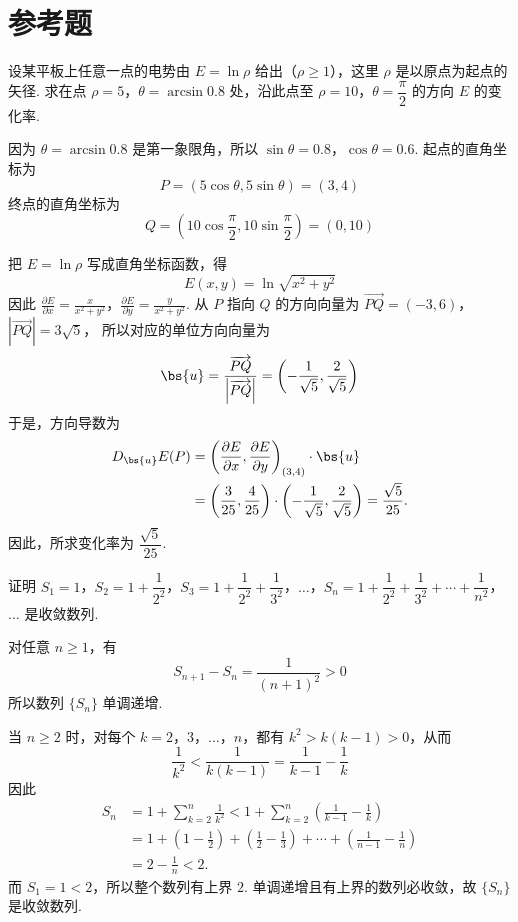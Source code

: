 \section{参考题}

\begin{problem}
设某平板上任意一点的电势由 \(E=\ln\rho\) 给出（\(\rho\geqslant1\)），这里 \(\rho\) 是以原点为起点的矢径. 求在点 \(\rho=5\)，\(\theta=\arcsin0.8\) 处，沿此点至 \(\rho=10\)，\(\theta=\dfrac{\pi}{2}\) 的方向 \(E\) 的变化率.
\end{problem}

\begin{solution}
因为 \(\theta=\arcsin0.8\) 是第一象限角，所以 \(\sin\theta=0.8\)，\(\cos\theta=0.6\). 起点的直角坐标为
\[
P=(5\cos\theta,5\sin\theta)=(3,4)
\]
终点的直角坐标为
\[
Q=\left(10\cos\frac\pi2,10\sin\frac\pi2\right)=(0,10)
\]


把 \(E=\ln\rho\) 写成直角坐标函数，得
\[
E(x,y)=\ln\sqrt{x^2+y^2}
\]
因此
\(\frac{\partial E}{\partial x}=\frac{x}{x^2+y^2}\)，\(\frac{\partial E}{\partial y}=\frac{y}{x^2+y^2}\).
从 \(P\) 指向 \(Q\) 的方向向量为
\(\overrightarrow{PQ}=(-3,6)\)，\(\left|\overrightarrow{PQ}\right|=3\sqrt5\)，
所以对应的单位方向向量为
\[
\bs{u}=\frac{\overrightarrow{PQ}}{\left|\overrightarrow{PQ}\right|}
=\left(-\frac1{\sqrt5},\frac2{\sqrt5}\right)
\]
于是，方向导数为
\[
\begin{aligned}
D_{\bs{u}}E(P)
&=\left(\frac{\partial E}{\partial x},\frac{\partial E}{\partial y}\right)_{(3,4)}\cdot\bs{u} \\
&=\left(\frac3{25},\frac4{25}\right)\cdot\left(-\frac1{\sqrt5},\frac2{\sqrt5}\right)
=\frac{\sqrt5}{25}.
\end{aligned}
\]
因此，所求变化率为 \(\dfrac{\sqrt5}{25}\).
\end{solution}

\begin{problem}
证明 \(S_1=1\)，\(S_2=1+\dfrac{1}{2^2}\)，\(S_3=1+\dfrac{1}{2^2}+\dfrac{1}{3^2}\)，\(\ldots\)，\(S_n=1+\dfrac{1}{2^2}+\dfrac{1}{3^2}+\cdots+\dfrac{1}{n^2}\)，\(\ldots\) 是收敛数列.
\end{problem}

\begin{solution}
对任意 \(n\geqslant1\)，有
\[
S_{n+1}-S_n=\frac{1}{(n+1)^2}>0
\]
所以数列 \(\{S_n\}\) 单调递增.

当 \(n\geqslant2\) 时，对每个 \(k=2\)，\(3\)，\(\ldots\)，\(n\)，都有 \(k^2>k(k-1)>0\)，从而
\[
\frac1{k^2}<\frac1{k(k-1)}=\frac1{k-1}-\frac1k
\]
因此
\[
\begin{aligned}
S_n
&=1+\sum_{k=2}^{n}\frac1{k^2}
<1+\sum_{k=2}^{n}\left(\frac1{k-1}-\frac1k\right) \\
&=1+\left(1-\frac12\right)+\left(\frac12-\frac13\right)+\cdots+\left(\frac1{n-1}-\frac1n\right) \\
&=2-\frac1n<2.
\end{aligned}
\]
而 \(S_1=1<2\)，所以整个数列有上界 \(2\). 单调递增且有上界的数列必收敛，故 \(\{S_n\}\) 是收敛数列.
\end{solution}
